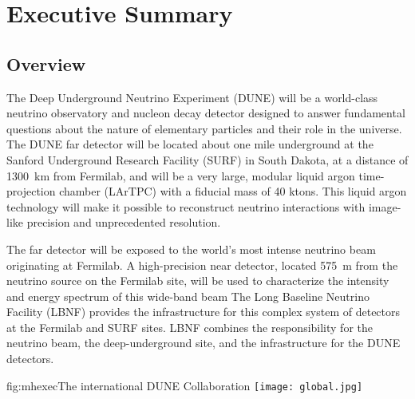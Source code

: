 \chapter{Executive Summary }
\label{ch:project-overview}
\section{Overview}
The Deep Underground Neutrino Experiment (DUNE) will be a world-class neutrino observatory and nucleon decay detector designed
to answer fundamental questions about the nature of elementary particles and their role in the universe. 
The DUNE far detector will be located about one mile underground at the Sanford Underground Research 
Facility (SURF) in South Dakota, at a distance of \SI{1300}{\km} from Fermilab, and
will be a very large, modular liquid argon time-projection chamber (LArTPC) with a fiducial mass of 40 ktons. 
This liquid argon technology will make it possible to reconstruct neutrino interactions with image-like precision
and unprecedented resolution.

The far detector will be exposed to
the world's most intense neutrino beam originating at Fermilab. 
A high-precision near detector, located 575~m from the neutrino source on the Fermilab site, will be used to characterize the intensity and energy spectrum of this wide-band beam
The Long Baseline Neutrino Facility (LBNF) provides the infrastructure for this complex system of detectors at the Fermilab and SURF sites.
LBNF combines the responsibility for the neutrino beam, 
the deep-underground site, and the infrastructure for the DUNE detectors.


\begin{dunefigure}{fig:mhexec}{The international DUNE
Collaboration}
\texttt{[image: global.jpg]}
\label{fig:map}
\end{dunefigure}

